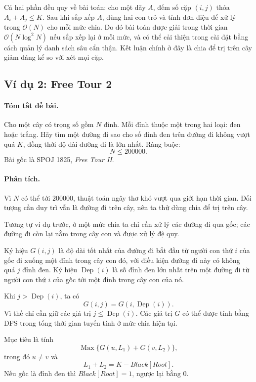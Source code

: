 \documentclass[11pt]{article}
\newcommand{\Oh}{\mathcal{O}}
\newcommand{\Dep}{\operatorname{Dep}}
\newcommand{\Max}{\operatorname{Max}}
\begin{document}
Cả hai phần đều quy về bài toán: cho một dãy \(A\), đếm số cặp
\((i,j)\) thỏa \(A_i+A_j\le K\). Sau khi sắp xếp \(A\), dùng hai con trỏ và
tính đơn điệu để xử lý trong \(\Oh(N)\) cho mỗi mức chia. Do đó bài toán được
giải trong thời gian \(\Oh(N\log^2 N)\) nếu sắp xếp lại ở mỗi mức, và có thể
cải thiện trong cài đặt bằng cách quản lý danh sách sâu cẩn thận. Kết luận
chính ở đây là chia để trị trên cây giảm đáng kể so với xét mọi cặp.

\subsection{Ví dụ 2: Free Tour 2}

\paragraph{Tóm tắt đề bài.}
Cho một cây có trọng số gồm \(N\) đỉnh. Mỗi đỉnh thuộc một trong hai loại:
đen hoặc trắng. Hãy tìm một đường đi sao cho số đỉnh đen trên đường đi không
vượt quá \(K\), đồng thời độ dài đường đi là lớn nhất. Ràng buộc:
\[
  N\le 200000.
\]
Bài gốc là SPOJ 1825, \textit{Free Tour II}.

\paragraph{Phân tích.}
Vì \(N\) có thể tới \(200000\), thuật toán ngây thơ khó vượt qua giới hạn thời
gian. Đối tượng cần duy trì vẫn là đường đi trên cây, nên ta thử dùng chia để
trị trên cây.

Tương tự ví dụ trước, ở một mức chia ta chỉ cần xử lý các đường đi qua gốc;
các đường đi còn lại nằm trong cây con và được xử lý đệ quy.

Ký hiệu \(G(i,j)\) là độ dài tốt nhất của đường đi bắt đầu từ người con thứ
\(i\) của gốc đi xuống một đỉnh trong cây con đó, với điều kiện đường đi này
có không quá \(j\) đỉnh đen. Ký hiệu \(\Dep(i)\) là số đỉnh đen lớn nhất trên
một đường đi từ người con thứ \(i\) của gốc tới một đỉnh trong cây con của nó.

Khi \(j>\Dep(i)\), ta có
\[
  G(i,j)=G(i,\Dep(i)).
\]
Vì thế chỉ cần giữ các giá trị \(j\le \Dep(i)\). Các giá trị \(G\) có thể
được tính bằng DFS trong tổng thời gian tuyến tính ở mức chia hiện tại.

Mục tiêu là tính
\[
  \Max\{G(u,L_1)+G(v,L_2)\},
\]
trong đó \(u\ne v\) và
\[
  L_1+L_2=K-\mathit{Black}[\mathit{Root}].
\]
Nếu gốc là đỉnh đen thì \(\mathit{Black}[\mathit{Root}]=1\), ngược lại bằng
\(0\).
\end{document}
